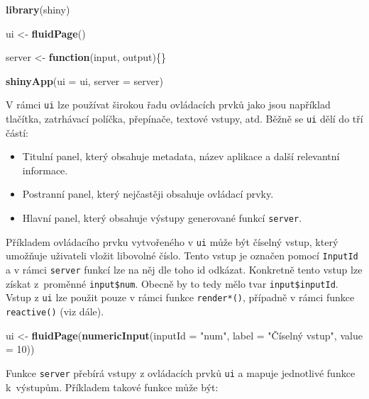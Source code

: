 \documentclass[12pt,]{article}
\newenvironment{Shaded}{\begin{snugshade}}{\end{snugshade}}
\newcommand{\KeywordTok}[1]{\textcolor[rgb]{0.13,0.29,0.53}{\textbf{#1}}}
\newcommand{\DataTypeTok}[1]{\textcolor[rgb]{0.13,0.29,0.53}{#1}}
\newcommand{\DecValTok}[1]{\textcolor[rgb]{0.00,0.00,0.81}{#1}}
\newcommand{\StringTok}[1]{\textcolor[rgb]{0.31,0.60,0.02}{#1}}
\newcommand{\ControlFlowTok}[1]{\textcolor[rgb]{0.13,0.29,0.53}{\textbf{#1}}}
\newcommand{\NormalTok}[1]{#1}
\providecommand{\tightlist}{%
  \setlength{\itemsep}{0pt}\setlength{\parskip}{0pt}}
\begin{document}
\begin{Shaded}
\begin{Highlighting}[]
\KeywordTok{library}\NormalTok{(shiny)}

\NormalTok{ui <-}\StringTok{ }\KeywordTok{fluidPage}\NormalTok{()}

\NormalTok{server <-}\StringTok{ }\ControlFlowTok{function}\NormalTok{(input, output)\{\}}

\KeywordTok{shinyApp}\NormalTok{(}\DataTypeTok{ui =}\NormalTok{ ui, }\DataTypeTok{server =}\NormalTok{ server)}
\end{Highlighting}
\end{Shaded}

V rámci \texttt{ui} lze používat širokou řadu ovládacích prvků jako jsou
například tlačítka, zatrhávací políčka, přepínače, textové vstupy, atd.
Běžně se \texttt{ui} dělí do tří částí:

\begin{itemize}
\tightlist
\item
  Titulní panel, který obsahuje metadata, název aplikace a další
  relevantní informace.
\item
  Postranní panel, který nejčastěji obsahuje ovládací prvky.
\item
  Hlavní panel, který obsahuje výstupy generované funkcí
  \texttt{server}.
\end{itemize}

Příkladem ovládacího prvku vytvořeného v \texttt{ui} může být číselný
vstup, který umožňuje uživateli vložit libovolné číslo. Tento vstup je
označen pomocí \texttt{InputId} a v rámci \texttt{server} funkcí lze na
něj dle toho id odkázat. Konkretně tento vstup lze získat z~proměnné
\texttt{input\$num}. Obecně by to tedy mělo tvar
\texttt{input\$inputId}. Vstup z \texttt{ui} lze použit pouze v rámci
funkce \texttt{render*()}, případně v rámci funkce \texttt{reactive()}
(viz dále).

\begin{Shaded}
\begin{Highlighting}[]
\NormalTok{ui <-}\StringTok{ }\KeywordTok{fluidPage}\NormalTok{(}\KeywordTok{numericInput}\NormalTok{(}\DataTypeTok{inputId =} \StringTok{"num"}\NormalTok{,}
                             \DataTypeTok{label =} \StringTok{"Číselný vstup"}\NormalTok{,}
                             \DataTypeTok{value =} \DecValTok{10}\NormalTok{))}
\end{Highlighting}
\end{Shaded}

Funkce \texttt{server} přebírá vstupy z ovládacích prvků \texttt{ui} a
mapuje jednotlivé funkce k~výstupům. Příkladem takové funkce může být:
\end{document}
